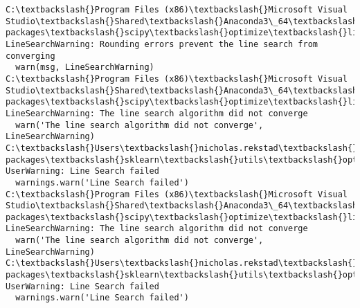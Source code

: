 \documentclass[11pt]{article}
\begin{document}
    \begin{Verbatim}[commandchars=\\\{\}]
C:\textbackslash{}Program Files (x86)\textbackslash{}Microsoft Visual Studio\textbackslash{}Shared\textbackslash{}Anaconda3\_64\textbackslash{}lib\textbackslash{}site-packages\textbackslash{}scipy\textbackslash{}optimize\textbackslash{}linesearch.py:422: LineSearchWarning: Rounding errors prevent the line search from converging
  warn(msg, LineSearchWarning)
C:\textbackslash{}Program Files (x86)\textbackslash{}Microsoft Visual Studio\textbackslash{}Shared\textbackslash{}Anaconda3\_64\textbackslash{}lib\textbackslash{}site-packages\textbackslash{}scipy\textbackslash{}optimize\textbackslash{}linesearch.py:313: LineSearchWarning: The line search algorithm did not converge
  warn('The line search algorithm did not converge', LineSearchWarning)
C:\textbackslash{}Users\textbackslash{}nicholas.rekstad\textbackslash{}AppData\textbackslash{}Roaming\textbackslash{}Python\textbackslash{}Python36\textbackslash{}site-packages\textbackslash{}sklearn\textbackslash{}utils\textbackslash{}optimize.py:195: UserWarning: Line Search failed
  warnings.warn('Line Search failed')
C:\textbackslash{}Program Files (x86)\textbackslash{}Microsoft Visual Studio\textbackslash{}Shared\textbackslash{}Anaconda3\_64\textbackslash{}lib\textbackslash{}site-packages\textbackslash{}scipy\textbackslash{}optimize\textbackslash{}linesearch.py:313: LineSearchWarning: The line search algorithm did not converge
  warn('The line search algorithm did not converge', LineSearchWarning)
C:\textbackslash{}Users\textbackslash{}nicholas.rekstad\textbackslash{}AppData\textbackslash{}Roaming\textbackslash{}Python\textbackslash{}Python36\textbackslash{}site-packages\textbackslash{}sklearn\textbackslash{}utils\textbackslash{}optimize.py:195: UserWarning: Line Search failed
  warnings.warn('Line Search failed')

    \end{Verbatim}
\end{document}
